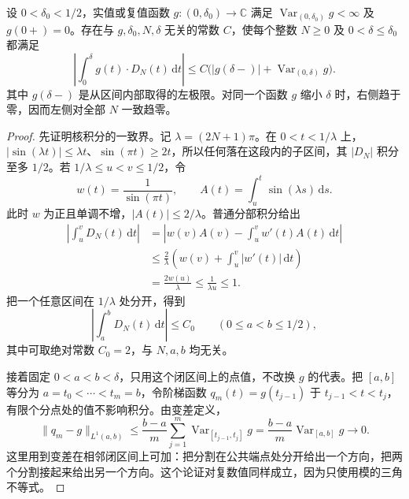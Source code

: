 \begin{lemma}\label{b2:lem:02-bv-oscillation}
设 \(0<\delta_0<1/2\)，实值或复值函数 \(g:(0,\delta_0)\to\mathbb C\) 满足 \(\operatorname{Var}_{(0,\delta_0)}g<\infty\) 及 \(g(0+)=0\)。存在与 \(g,\delta_0,N,\delta\) 无关的常数 \(C\)，使每个整数 \(N\geq0\) 及 \(0<\delta\leq\delta_0\) 都满足
\[
 \left|\int_0^\delta g(t)\cdot D_N(t)\,\mathrm{d}t\right|
 \leq C\bigl(|g(\delta-)|+\operatorname{Var}_{(0,\delta)}g\bigr).
\]
其中 \(g(\delta-)\) 是从区间内部取得的左极限。对同一个函数 \(g\) 缩小 \(\delta\) 时，右侧趋于零，因而左侧对全部 \(N\) 一致趋零。
\end{lemma}
\begin{proof}
先证明核积分的一致界。记 \(\lambda=(2N+1)\pi\)。在 \(0<t<1/\lambda\) 上，\(|\sin(\lambda t)|\leq\lambda t\)、\(\sin(\pi t)\geq2t\)，所以任何落在这段内的子区间，其 \(|D_N|\) 积分至多 \(1/2\)。若 \(1/\lambda\leq u<v\leq1/2\)，令
\[
 w(t)=\frac1{\sin(\pi t)},\qquad
 A(t)=\int_u^t\sin(\lambda s)\,\mathrm ds.
\]
此时 \(w\) 为正且单调不增，\(|A(t)|\leq2/\lambda\)。普通分部积分给出
\[
 \begin{aligned}
 \left|\int_u^vD_N(t)\,\mathrm dt\right|
 &=\left|w(v)A(v)-\int_u^vw'(t)A(t)\,\mathrm dt\right|\\
 &\leq\frac2\lambda\left(w(v)+\int_u^v|w'(t)|\,\mathrm dt\right)\\
 &=\frac{2w(u)}\lambda\leq\frac1{\lambda u}\leq1.
 \end{aligned}
\]
把一个任意区间在 \(1/\lambda\) 处分开，得到
\[
 \left|\int_a^bD_N(t)\,\mathrm dt\right|\leq C_0
 \qquad(0\leq a<b\leq1/2),
\]
其中可取绝对常数 \(C_0=2\)，与 \(N,a,b\) 均无关。

接着固定 \(0<a<b<\delta\)，只用这个闭区间上的点值，不改换 \(g\) 的代表。把 \([a,b]\) 等分为 \(a=t_0<\cdots<t_m=b\)，令阶梯函数 \(q_m(t)=g(t_{j-1})\) 于 \(t_{j-1}<t<t_j\)，有限个分点处的值不影响积分。由变差定义，
\[
 \|q_m-g\|_{L^1(a,b)}
 \leq\frac{b-a}{m}\sum_{j=1}^m
       \operatorname{Var}_{[t_{j-1},t_j]}g
 =\frac{b-a}{m}\operatorname{Var}_{[a,b]}g\longrightarrow0.
\]
这里用到变差在相邻闭区间上可加：把分割在公共端点处分开给出一个方向，把两个分割接起来给出另一个方向。这个论证对复数值同样成立，因为只使用模的三角不等式。


\end{proof}
